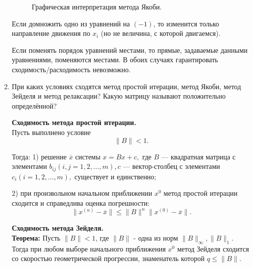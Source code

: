 \documentclass[12pt, a4paper]{article}
\begin{document}
\begin{enumerate}
\begin{figure}[H]
\caption{Графическая интерпретация метода Якоби.}
\label{fig:yakobi}
\end{figure}
	
Если домножить одно из уравнений на $(-1)$, то изменится только направление движения по $x_{i}$ (но не величина, с которой двигаемся). 

Если поменять порядок уравнений местами, то прямые, задаваемые данными уравнениями, поменяются местами. В обоих случаях гарантировать сходимость/расходимость невозможно.
	

	
\item При каких условиях сходятся метод простой итерации, метод Якоби, метод Зейделя и метод релаксации? Какую матрицу называют положительно определённой?

\textbf{Сходимость метода простой итерации.}\\
Пусть выполнено условие 
$$\|B\|<1.$$

Тогда: 1) решение $\overline x$ системы $x=Bx+c,$ где $B$ --- квадратная матрица с элементами $b_{ij} (i,j=1,2,\ldots,m), c$ --- вектор-столбец с элементами $c_{i} (i=1,2,\ldots,m),$ существует и единственно;

2) при произвольном начальном приближении $x^{0}$ метод простой итерации сходится и справедлива оценка погрешности: 
$$ \|x^{(n)}-\overline x\| \leq \|B\|^{n}\|x^{(0)}-\overline x\|.$$
		
\textbf{Сходимость метода Зейделя.}\\
\textbf{Теорема:}
Пусть $\|B\|<1$, где $\|B\|$ - одна из норм $\|B\|_{\infty},\|B\|_{1}.$ Тогда при любом выборе начального приближения $x^{0}$ метод Зейделя сходится со скоростью геометрической прогрессии, знаменатель которой $q \leq \|B\|$.


\end{enumerate}
\end{document}
